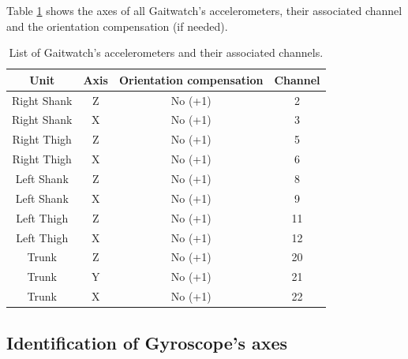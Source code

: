 Table \ref{tab:acc_channels} shows the axes of all Gaitwatch's accelerometers, their associated channel and the orientation compensation (if needed).
\begin{table}
\caption{List of Gaitwatch's accelerometers and their associated channels.}
	\centering
		\begin{tabular}{|c|c|c|c|}\hline
		\label{tab:acc_channels}
		Unit 				& Axis 	& Orientation compensation 	& Channel 	\\ \hline
		Right Shank & Z			& No  (+1)									& 2					\\
		Right Shank	& X			& No  (+1)									& 3					\\
		Right Thigh & Z			& No  (+1)									& 5					\\
		Right Thigh	& X			& No  (+1)									& 6					\\
		Left Shank  & Z			& No  (+1)									& 8					\\
		Left Shank	& X			& No  (+1)									& 9					\\
		Left Thigh  & Z			& No  (+1)									& 11				\\
		Left Thigh	& X			& No  (+1)									& 12				\\
		Trunk				& Z			& No	(+1)									& 20				\\
		Trunk				& Y			& No	(+1)									& 21				\\	
		Trunk				& X			& No	(+1)									& 22				\\ \hline
		\end{tabular}
\end{table}

\subsection{Identification of Gyroscope's axes}
\label{subsec:gyro_ID}

